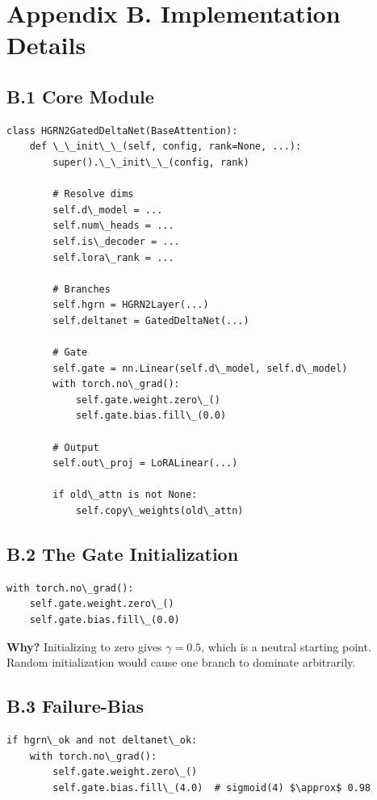 \section{Appendix B. Implementation Details}

\subsection{B.1 Core Module}

\begin{lstlisting}
class HGRN2GatedDeltaNet(BaseAttention):
    def \_\_init\_\_(self, config, rank=None, ...):
        super().\_\_init\_\_(config, rank)
        
        # Resolve dims
        self.d\_model = ...
        self.num\_heads = ...
        self.is\_decoder = ...
        self.lora\_rank = ...
        
        # Branches
        self.hgrn = HGRN2Layer(...)
        self.deltanet = GatedDeltaNet(...)
        
        # Gate
        self.gate = nn.Linear(self.d\_model, self.d\_model)
        with torch.no\_grad():
            self.gate.weight.zero\_()
            self.gate.bias.fill\_(0.0)
        
        # Output
        self.out\_proj = LoRALinear(...)
        
        if old\_attn is not None:
            self.copy\_weights(old\_attn)
\end{lstlisting}

\subsection{B.2 The Gate Initialization}

\begin{lstlisting}
with torch.no\_grad():
    self.gate.weight.zero\_()
    self.gate.bias.fill\_(0.0)
\end{lstlisting}

\textbf{Why?} Initializing to zero gives $\gamma = 0.5$, which is a neutral 
starting point. Random initialization would cause one branch to dominate 
arbitrarily.

\subsection{B.3 Failure-Bias}

\begin{lstlisting}
if hgrn\_ok and not deltanet\_ok:
    with torch.no\_grad():
        self.gate.weight.zero\_()
        self.gate.bias.fill\_(4.0)  # sigmoid(4) $\approx$ 0.98
\end{lstlisting}

